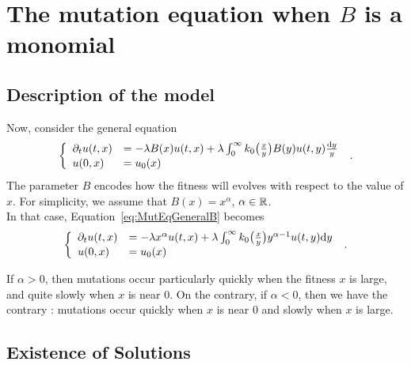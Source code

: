\documentclass[11pt]{amsart}
\begin{document}
\section{The mutation equation when $B$ is a monomial}

\subsection{Description of the model}
Now, consider the general equation
\begin{align}
    \left\{\begin{array}{ll}
        \partial_t u(t,x) &= -\lambda B(x) u(t,x) + \lambda \int_0^{\infty} k_0\big(\frac{x}{y}\big) B(y) u(t,y) \frac{\mathrm dy}{y} \\
    u(0,x) &= u_0(x) 
    \end{array}
    \right.
    \; .
    \label{eq:MutEqGeneralB}
\end{align}
The parameter $B$ encodes how the fitness will evolves with respect to the value of $x$. For simplicity, we assume that $B(x) = x^\alpha$, $\alpha \in \mathbb{R}$. \\

In that case, Equation~\eqref{eq:MutEqGeneralB} becomes 
\begin{align}
    \left\{\begin{array}{ll}
        \partial_t u(t,x) &= -\lambda x^{\alpha} u(t,x) + \lambda \int_0^{\infty} k_0\big(\frac{x}{y}\big) y^{\alpha-1} u(t,y) \mathrm dy \\
    u(0,x) &= u_0(x) 
    \end{array}
    \right.
    \; .
    \label{eq:MutEqGenMonomial}
\end{align}

\begin{remark}
    If $\alpha > 0$, then mutations occur particularly quickly when the fitness $x$ is large, and quite slowly when $x$ is near $0$. On the contrary, if $\alpha < 0$, then we have the contrary : mutations occur quickly when $x$ is near $0$ and slowly when $x$ is large. 
\end{remark}



\subsection{Existence of Solutions}
\end{document}
